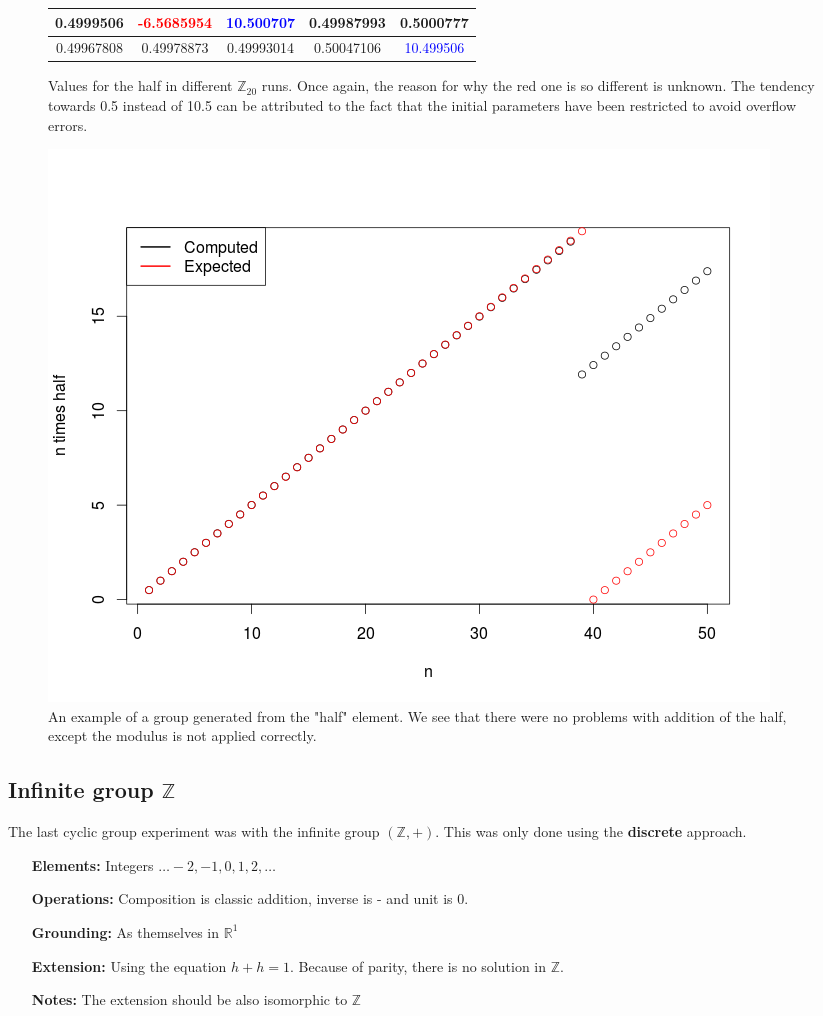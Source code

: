 \begin{figure}[h]
\centering
\caption{Values for the half in different $\mathbb{Z}_{20}$ runs. Once again, the reason for why the red one is so different is unknown. The tendency towards 0.5 instead of 10.5 can be attributed to the fact that the initial parameters have been restricted to avoid overflow errors.}
\label{table:z20_half}
\begin{tabular}{|c|c|c|c|c|}
\hline
0.4999506 & \textcolor{red}{-6.5685954} & \textcolor{blue}{10.500707} & 0.49987993 & 0.5000777\\
\hline
0.49967808 & 0.49978873 & 0.49993014 & 0.50047106 & \textcolor{blue}{10.499506}\\
\hline
\end{tabular}
\end{figure}

\begin{figure}[h]
\centering
\caption{An example of a group generated from the "half" element. We see that there were no problems with addition of the half, except the modulus is not applied correctly.}
\label{graph:z20_half_generator}
\includegraphics[width=0.8\linewidth]{../img/z20_half_plot.png}
\end{figure}

\subsection{Infinite group $\mathbb{Z}$}
The last cyclic group experiment was with the infinite group $(\mathbb{Z},+)$. This was only done using the \textbf{discrete} approach.

\begin{itemize}
	\item[\textbf{Elements:}] Integers $\dots-2,-1,0,1,2,\dots$
	\item[\textbf{Operations:}] Composition is classic addition, inverse is - and unit is 0.
	\item[\textbf{Grounding:}] As themselves in $\mathbb{R}^1$
	\item[\textbf{Extension:}] Using the equation $h+h=1$. Because of parity, there is no solution in $\mathbb{Z}$.
	\item[\textbf{Notes:}] The extension should be also isomorphic to $\mathbb{Z}$
\end{itemize}

